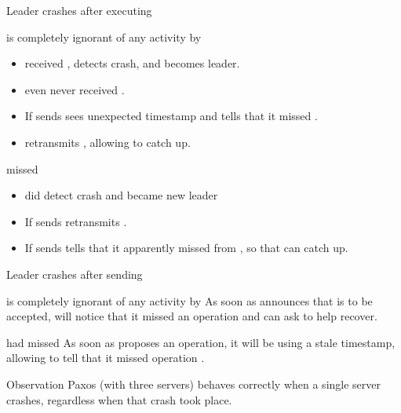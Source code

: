 \begin{slide}{Leader crashes after executing }
  \onslide
  \begin{block}{ is completely ignorant of any activity by }
    \begin{itemize}
    \item {} received , detects crash, and becomes leader.
    \item {} even never received . 
    \item If  sends   sees unexpected timestamp
      and tells  that it missed . 
    \item {} retransmits , allowing  to catch up.
    \end{itemize}
  \end{block}
  \onslide
  \begin{block}{ missed }
    \begin{itemize}
    \item {} did detect crash and became new leader
    \item If  sends   retransmits
      . 
    \item If  sends   tells  that it
      apparently missed  from , so that  can catch up. 
    \end{itemize}
  \end{block}
\end{slide}
\begin{slide}{Leader crashes after sending }
  \begin{block}{ is completely ignorant of any activity by }
    As soon as  announces that  is to be accepted,  will notice that it missed an
    operation and can ask  to help recover.
  \end{block}
  \begin{block}{ had missed }
    As soon as  proposes an operation, it will be using a stale timestamp, allowing  to tell
     that it missed operation .
  \end{block}
  \onslide
  \begin{alertblock}{Observation}
    Paxos (with three servers) behaves correctly when a single server crashes, regardless when that crash took
    place.
  \end{alertblock}
\end{slide}
